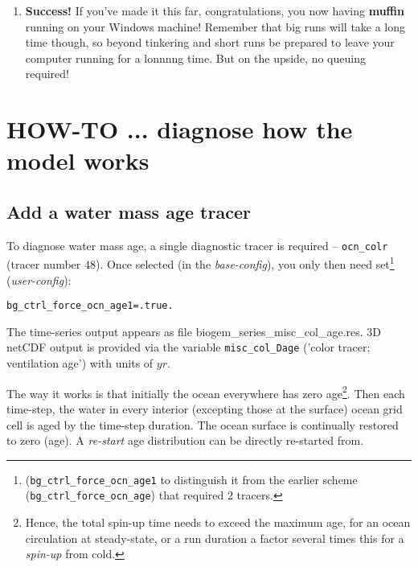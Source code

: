 \documentclass[11pt,fleqn]{book} %
\begin{document}
\begin{enumerate}[noitemsep]
\vspace{2mm}
\item \textbf{Success!} If you’ve made it this far, congratulations,
  you now having \textbf{muffin} running on your Windows machine!
  Remember that big runs will take a long time though, so beyond
  tinkering and short runs be prepared to leave your computer running
  for a lonnnng time. But on the upside, no queuing required!

\end{enumerate}


\newpage


\section{HOW-TO ... diagnose how the model works}
\vspace{2mm}

%
\subsection*{Add a water mass age tracer}
\vspace{1mm}

To diagnose water mass age, a single diagnostic tracer is required -- \texttt{ocn\_colr} (tracer number \(48\)). Once selected (in the \textit{base-config}), you only then need set\footnote{(\texttt{bg\_ctrl\_force\_ocn\_age1} to distinguish it from the earlier scheme (\texttt{bg\_ctrl\_force\_ocn\_age}) that required 2 tracers.} (\textit{user-config}):
\vspace{-2pt}\begin{verbatim}
bg_ctrl_force_ocn_age1=.true.
\end{verbatim}\vspace{-2pt}
 
The time-series output appears as file \textsf{\footnotesize biogem\_series\_misc\_col\_age.res}. 3D netCDF output is provided via the variable \texttt{misc\_col\_Dage} ('color tracer; ventilation age') with units of \(yr\).

The way it works is that initially the ocean everywhere has zero age\footnote{Hence, the total spin-up time needs to exceed the maximum age, for an ocean circulation at steady-state, or a run duration a factor several times this for a \textit{spin-up} from cold.}. Then each time-step, the water in every interior (excepting those at the surface) ocean grid cell is aged by the time-step duration. The ocean surface is continually restored to zero (age). A \textit{re-start} age distribution can be directly re-started from.
\end{document}
